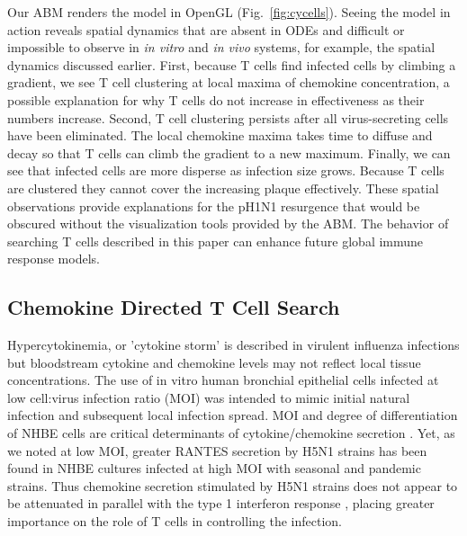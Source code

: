 \documentclass[10pt]{article}
\begin{document}
Our ABM renders the model in OpenGL (Fig.~\ref{fig:cycells}).  Seeing the model in action reveals spatial dynamics that are absent in ODEs and difficult or impossible to observe in \textit{in vitro} and \textit{in vivo} systems, for example, the spatial dynamics discussed earlier.  First, because T cells find infected cells by climbing a gradient, we see T cell clustering at local maxima of chemokine concentration, a possible explanation for why T cells do not increase in effectiveness as their numbers increase.   Second, T cell clustering persists after all virus-secreting cells have been eliminated.  The local chemokine maxima takes time to diffuse and decay so that T cells can climb the gradient to a new maximum.  Finally, we can see that infected cells are more disperse as infection size grows.  Because T cells are clustered they cannot cover the increasing plaque effectively.  These spatial observations provide explanations for the pH1N1 resurgence that would be obscured without the visualization tools provided by the ABM.   The behavior of searching T cells described in this paper 
can enhance future global immune response models.

\subsection*{Chemokine Directed T Cell Search}

Hypercytokinemia, or 'cytokine storm' is described in virulent influenza infections \cite{DeJong2006} but bloodstream cytokine and chemokine levels may not reflect local tissue concentrations.  The use of in vitro human bronchial epithelial cells \cite{Mitchell2011} infected at low cell:virus infection ratio (MOI) was intended to mimic initial natural infection and subsequent local infection spread.  MOI and degree of differentiation of NHBE cells are critical determinants of cytokine/chemokine secretion \cite{Chan2010}.   Yet, as we noted at low MOI, greater RANTES secretion by H5N1 strains has been found in NHBE cultures infected at high MOI with seasonal \cite{Chan2005, Chan2010, Zeng2011} and pandemic \cite{Zeng2011} strains.  Thus chemokine secretion stimulated by H5N1 strains does not appear to be attenuated in parallel with the type 1 interferon response \cite{Zeng2007}, placing greater importance on the role of T cells in controlling the infection.
\end{document}
